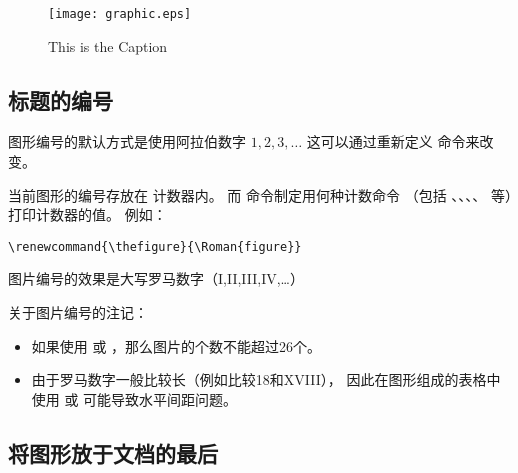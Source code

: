 \begin{figure} 
	\centering 
	\texttt{[image: graphic.eps]} 
	\renewcommand{\figurename}{Fig.} 
	\caption{This is the Caption}\label{fig:figname} 
\end{figure}

\subsection{标题的编号}

图形编号的默认方式是使用阿拉伯数字 $1,2,3,\dots$
这可以通过重新定义  命令来改变。

当前图形的编号存放在  计数器内。
而  命令制定用何种计数命令
（包括 、、、、 等）打印计数器的值。
例如：
\begin{lstlisting}
\renewcommand{\thefigure}{\Roman{figure}}
\end{lstlisting}
图片编号的效果是大写罗马数字（I,II,III,IV,\dots）

关于图片编号的注记：
\begin{itemize}
	\item 如果使用  或 ，那么图片的个数不能超过26个。
	\item 由于罗马数字一般比较长（例如比较18和XVIII），
	因此在图形组成的表格中使用  或  可能导致水平间距问题。
\end{itemize}

\subsection{将图形放于文档的最后}\label{ssec:endfloat}

